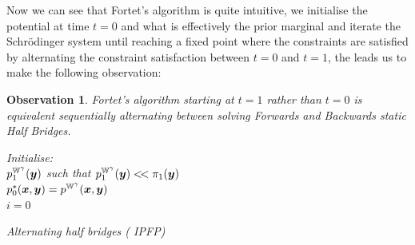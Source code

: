 \documentclass[a4paper,12pt,twoside,openright]{report}
\newtheorem{observation}[theorem]{Observation}
\theoremstyle{definition}
\begin{document}
Now we can see that Fortet's algorithm is quite intuitive, we initialise the potential at time $t=0$ and what is effectively the prior marginal and iterate the Schrödinger system until reaching a fixed point where the constraints are satisfied by alternating the constraint satisfaction between $t=0$ and $t=1$, the leads us to make the following observation:
\begin{observation}
Fortet's algorithm starting at $t=1$ rather than $t=0$ is equivalent sequentially alternating between solving  Forwards and Backwards static Half Bridges.
\begin{algorithm} \label{alg:ipfp_intro}
Initialise:\\
$p^{\mathbb{W}^{\gamma}}_1({\bm{y}})$ such that $p^{\mathbb{W}^{\gamma}}_1({\bm{y}}) <\!< \pi_1({\bm{y}})$ \\
$ p^{*}_{0}({\bm{x}},{\bm{y}}) =p^{\mathbb{W}^{\gamma}}({\bm{x}},{\bm{y}})$\\
$i=0$ \\
\caption{Alternating half bridges (\cite{kullback1968probability} IPFP) }
\end{algorithm}
\end{observation}
\end{document}

